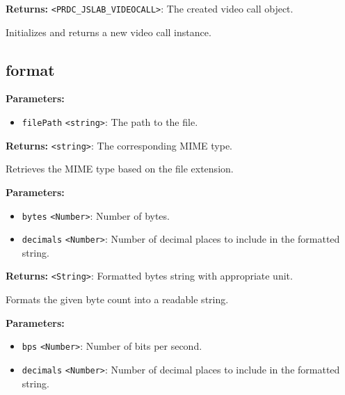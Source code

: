 \documentclass[12pt,a4paper]{article}
\begin{document}
\noindent \textbf{Returns:} \texttt{<PRDC\_JSLAB\_VIDEOCALL>}: The created video call object.

\noindent Initializes and returns a new video call instance.


\subsection{format}
\vspace{5mm}
\noindent {}


\noindent \textbf{Parameters:}
\begin{itemize}
  \item \texttt{filePath} \texttt{<string>}: The path to the file.
\end{itemize}

\noindent \textbf{Returns:} \texttt{<string>}: The corresponding MIME type.

\noindent Retrieves the MIME type based on the file extension.

\vspace{5mm}
\noindent {}


\noindent \textbf{Parameters:}
\begin{itemize}
  \item \texttt{bytes} \texttt{<Number>}: Number of bytes.
  \item \texttt{decimals} \texttt{<Number>}: Number of decimal places to include in the formatted string.
\end{itemize}

\noindent \textbf{Returns:} \texttt{<String>}: Formatted bytes string with appropriate unit.

\noindent Formats the given byte count into a readable string.

\vspace{5mm}
\noindent {}


\noindent \textbf{Parameters:}
\begin{itemize}
  \item \texttt{bps} \texttt{<Number>}: Number of bits per second.
  \item \texttt{decimals} \texttt{<Number>}: Number of decimal places to include in the formatted string.
\end{itemize}
\end{document}
